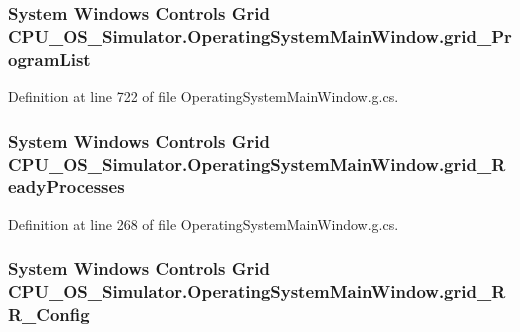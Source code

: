 \subsubsection[{grid\+\_\+\+Program\+List}]{\setlength{\rightskip}{0pt plus 5cm}System Windows Controls Grid C\+P\+U\+\_\+\+O\+S\+\_\+\+Simulator.\+Operating\+System\+Main\+Window.\+grid\+\_\+\+Program\+List\hspace{0.3cm}{\ttfamily [package]}}\label{class_c_p_u___o_s___simulator_1_1_operating_system_main_window_a22160eecd007b7aedf48db6c64eb2da6}


Definition at line 722 of file Operating\+System\+Main\+Window.\+g.\+cs.

\hypertarget{class_c_p_u___o_s___simulator_1_1_operating_system_main_window_a4dc7b1233f61261fad09e145e63563a3}{}
\subsubsection[{grid\+\_\+\+Ready\+Processes}]{\setlength{\rightskip}{0pt plus 5cm}System Windows Controls Grid C\+P\+U\+\_\+\+O\+S\+\_\+\+Simulator.\+Operating\+System\+Main\+Window.\+grid\+\_\+\+Ready\+Processes\hspace{0.3cm}{\ttfamily [package]}}\label{class_c_p_u___o_s___simulator_1_1_operating_system_main_window_a4dc7b1233f61261fad09e145e63563a3}


Definition at line 268 of file Operating\+System\+Main\+Window.\+g.\+cs.

\hypertarget{class_c_p_u___o_s___simulator_1_1_operating_system_main_window_a626ad676e978db5c0d52825764e68ea5}{}
\subsubsection[{grid\+\_\+\+R\+R\+\_\+\+Config}]{\setlength{\rightskip}{0pt plus 5cm}System Windows Controls Grid C\+P\+U\+\_\+\+O\+S\+\_\+\+Simulator.\+Operating\+System\+Main\+Window.\+grid\+\_\+\+R\+R\+\_\+\+Config\hspace{0.3cm}{\ttfamily [package]}}\label{class_c_p_u___o_s___simulator_1_1_operating_system_main_window_a626ad676e978db5c0d52825764e68ea5}



